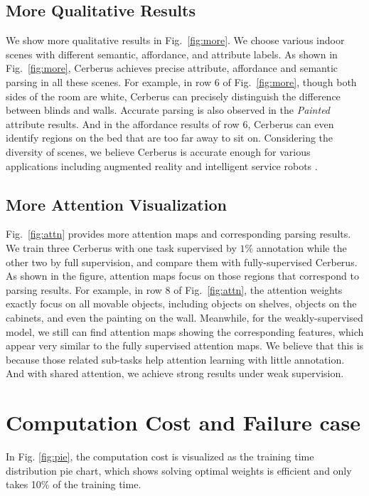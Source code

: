 \documentclass[10pt,twocolumn,letterpaper]{article}
\begin{document}
\subsection{More Qualitative Results}

We show more qualitative results in Fig.~\ref{fig:more}.  We choose various indoor scenes with different semantic, affordance, and attribute labels. As shown in Fig.~\ref{fig:more}, Cerberus achieves precise attribute, affordance and semantic parsing in all these scenes. For example, in row 6 of Fig.~\ref{fig:more}, though both sides of the room are white, Cerberus can precisely distinguish the difference between blinds and walls. Accurate parsing is also observed in the \emph{Painted} attribute results.  And in the affordance results of row 6, Cerberus can even identify regions on the bed that are too far away to sit on.  Considering the diversity of scenes, we believe Cerberus is accurate enough for various applications including augmented reality and intelligent service robots . 

\subsection{More Attention Visualization}

Fig.~\ref{fig:attn} provides more attention maps and corresponding parsing results. We train three Cerberus with one task supervised by $1\%$ annotation while the other two by full supervision, and compare them with fully-supervised Cerberus.  As shown in the figure, attention maps focus on those regions that correspond to parsing results. For example, in row 8 of Fig.~\ref{fig:attn}, the attention weights exactly focus on all movable objects, including objects on shelves, objects on the cabinets, and even the painting on the wall. Meanwhile, for the weakly-supervised model, we still can find attention maps showing the corresponding features, which appear very similar to the fully supervised attention maps. We believe that this is because those related sub-tasks help attention learning with little annotation. And with shared attention, we achieve strong results under weak supervision.

\section{Computation Cost and Failure case}
In Fig. \ref{fig:pie}, the computation cost is visualized as the training time distribution pie chart, which shows solving optimal weights is efficient and only takes 10\% of the training time. 
\end{document}

